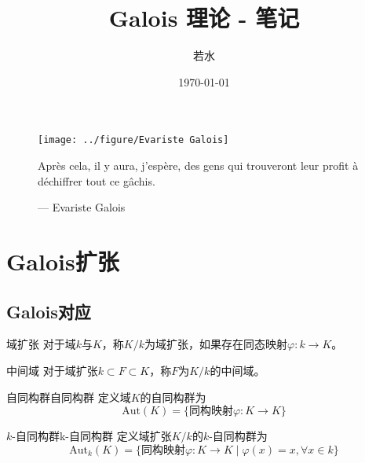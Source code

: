 \documentclass[lang = cn, scheme = chinese, thmcnt = section, usesamecnt]{elegantbook}
\title{Galois 理论 - 笔记}                %
\author{若水}                        %
\date{\today}                       %
\newcommand{\sub}{\subset}             %
\newcommand{\Aut}{\mathrm{Aut}}
\begin{document}
\maketitle       %

\frontmatter     %

\begin{figure}[p]
	\centering
	\texttt{[image: ../figure/Evariste Galois]}
	\vspace{2.1cm}
	
	{\large{} Après cela, il y aura, j'espère, des gens qui trouveront leur profit à déchiffrer tout ce gâchis.}
	
	\begin{flushright}
		--- {\large{} Evariste Galois}
	\end{flushright}
\end{figure}

\tableofcontents %

\mainmatter      %

\chapter{Galois扩张}

\section{Galois对应}

\begin{definition}{域扩张}
	对于域$k$与$K$，称$K/k$为域扩张，如果存在同态映射$\varphi:k\to K$。
\end{definition}

\begin{definition}{中间域}
	对于域扩张$k\sub F \sub K$，称$F$为$K/k$的中间域。
\end{definition}

\begin{definition}{自同构群}{自同构群}
	定义域$K$的自同构群为
	$$
	\Aut(K)=\{ \text{同构映射}\varphi:K\to K \}
	$$
\end{definition}

\begin{definition}{$k$-自同构群}{k-自同构群}
	定义域扩张$K/k$的$k$-自同构群为
	$$
	\Aut_k(K)=\{ \text{同构映射}\varphi:K\to K\mid \varphi(x)=x,\forall x\in k \}
	$$
\end{definition}
\end{document}
